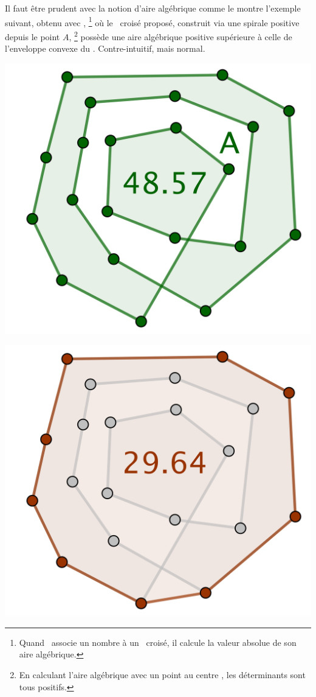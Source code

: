 

\begin{remark}
    Il faut être prudent avec la notion d'aire algébrique comme le montre l'exemple suivant, obtenu avec \geogebra,%
    \footnote{
        Quand \geogebra\ associe un nombre à un \ngone\ croisé, il calcule la valeur absolue de son aire algébrique.
    }
    où le \ngone\ croisé proposé, construit via une spirale positive depuis le point $A$,%
    \footnote{
        En calculant l'aire algébrique avec un point \og au centre \fg, les déterminants sont tous positifs.
    }
    possède une aire algébrique positive supérieure à celle de l'enveloppe convexe du \ngone. Contre-intuitif, mais normal.


    \begin{multicols}{2}
        \small\itshape\centering
        \includegraphics[scale=.3]{ncycle-not-opti-pb-1.png}

        \includegraphics[scale=.3]{ncycle-not-opti-pb-2.png}
    \end{multicols}
\end{remark}



